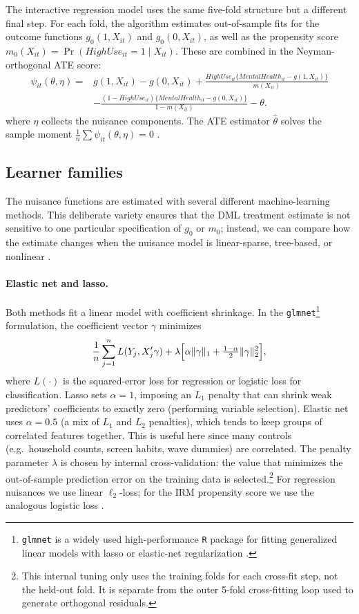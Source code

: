 \documentclass[11pt,oneside,a4paper]{book}
\begin{document}
The interactive regression model uses the same five-fold structure but a different final step. For each fold, the algorithm estimates out-of-sample fits for the outcome functions \(g_0(1,X_{it})\) and \(g_0(0,X_{it})\), as well as the propensity score \(m_0(X_{it}) = \Pr(HighUse_{it}=1\mid X_{it})\). These are combined in the Neyman-orthogonal ATE score:
\begin{align*}
\psi_{it}(\theta,\eta)
={}&
g(1,X_{it})-g(0,X_{it})
+\frac{HighUse_{it}\{MentalHealth_{it}-g(1,X_{it})\}}{m(X_{it})} \nonumber\\
&-\frac{(1-HighUse_{it})\{MentalHealth_{it}-g(0,X_{it})\}}{1-m(X_{it})}
-\theta.
\end{align*}
where \(\eta\) collects the nuisance components. The ATE estimator \(\widehat{\theta}\) solves the sample moment \(\frac{1}{n}\sum \psi_{it}(\theta,\eta)=0\) \citep{chernozhukov2018dml,bach2024doubleml,baiardi2024valueadded}.

\subsection[Learner Families]{Learner families}

The nuisance functions are estimated with several different machine-learning methods. This deliberate variety ensures that the DML treatment estimate is not sensitive to one particular specification of \(g_0\) or \(m_0\); instead, we can compare how the estimate changes when the nuisance model is linear-sparse, tree-based, or nonlinear \citep{chernozhukov2018dml,fuhr2024dml}.

\paragraph{Elastic net and lasso.}
Both methods fit a linear model with coefficient shrinkage. In the \texttt{glmnet}\footnote{\texttt{glmnet} is a widely used high-performance \texttt{R} package for fitting generalized linear models with lasso or elastic-net regularization \citep{friedman2010glmnet}.} formulation, the coefficient vector \(\gamma\) minimizes
\[
  \frac{1}{n}\sum_{j=1}^n L(Y_j, X_j'\gamma)
  + \lambda \Bigl[\alpha\|\gamma\|_1 + \tfrac{1-\alpha}{2}\|\gamma\|_2^2\Bigr],
\]
where \(L(\cdot)\) is the squared-error loss for regression or logistic loss for classification. Lasso sets \(\alpha=1\), imposing an \(L_1\) penalty that can shrink weak predictors' coefficients to exactly zero (performing variable selection). Elastic net uses \(\alpha=0.5\) (a mix of \(L_1\) and \(L_2\) penalties), which tends to keep groups of correlated features together. This is useful here since many controls (e.g.\ household counts, screen habits, wave dummies) are correlated. The penalty parameter \(\lambda\) is chosen by internal cross-validation: the value that minimizes the out-of-sample prediction error on the training data is selected.\footnote{This internal tuning only uses the training folds for each cross-fit step, not the held-out fold. It is separate from the outer 5-fold cross-fitting loop used to generate orthogonal residuals.} For regression nuisances we use linear \(\ell_2\)-loss; for the IRM propensity score we use the analogous logistic loss \citep{tibshirani1996lasso,zou2005elasticnet,friedman2010glmnet}.
\end{document}
